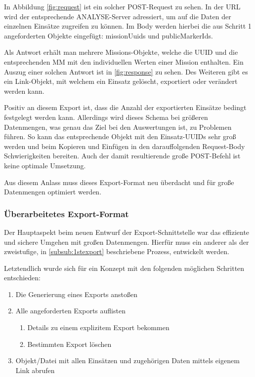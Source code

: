 In Abbildung \ref{fig:request} ist ein solcher POST-Request zu sehen.
In der URL wird der entsprechende \gls{ANALYSE}-Server adressiert, um auf die Daten der einzelnen Einsätze zugreifen zu können.
Im Body werden hierbei die aus Schritt 1 angeforderten Objekte eingefügt: \glqq missionUuids\grqq{} und \glqq publicMarkerIds\grqq.

Als Antwort erhält man mehrere \glqq Missions-Objekte\grqq{}, welche die \gls{UUID} und die entsprechenden \gls{MM} mit den individuellen Werten einer Mission enthalten.
Ein Auszug einer solchen Antwort ist in \ref{fig:response} zu sehen.
Des Weiteren gibt es ein \glqq Link-Objekt\grqq{}, mit welchem ein Einsatz gelöscht, exportiert oder verändert werden kann. 

Positiv an diesem Export ist, dass die Anzahl der exportierten Einsätze bedingt festgelegt werden kann.
Allerdings wird dieses Schema bei größeren Datenmengen, was genau das Ziel bei den Auswertungen ist, zu Problemen führen.
So kann das entsprechende Objekt mit den Einsatz-\gls{UUID}s sehr groß werden und beim Kopieren und Einfügen in den darauffolgenden Request-Body Schwierigkeiten bereiten.
Auch der damit resultierende große POST-Befehl ist keine optimale Umsetzung.

Aus diesem Anlass muss dieses Export-Format neu überdacht und für große Datenmengen optimiert werden.

\subsubsection{Überarbeitetes Export-Format}
\label{subsub:ueberarbeutetesformat}
Der Hauptaspekt beim neuen Entwurf der Export-Schnittstelle war das effiziente und sichere Umgehen mit großen Datenmengen.
Hierfür muss ein anderer als der zweistufige, in \ref{subsub:1stexport} beschriebene Prozess, entwickelt werden.


Letztendlich wurde sich für ein Konzept mit den folgenden möglichen Schritten entschieden:
\begin{enumerate}
\item Die Generierung eines Exports anstoßen
\item Alle angeforderten Exports auflisten
	\begin{enumerate}
	\item Details zu einem explizitem Export bekommen
	\item Bestimmten Export löschen
	\end{enumerate}
\item Objekt/Datei mit allen Einsätzen und zugehörigen Daten mittels eigenem Link abrufen
\end{enumerate} 

